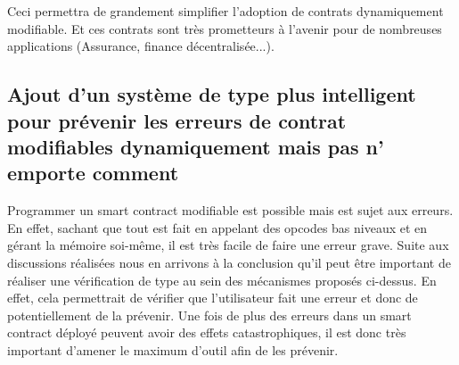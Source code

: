 Ceci permettra de grandement simplifier l'adoption de contrats dynamiquement modifiable. Et ces contrats sont très
prometteurs à l'avenir pour de nombreuses applications (Assurance, finance décentralisée...).

\subsection{Ajout d'un système de type plus intelligent pour prévenir les erreurs de contrat modifiables dynamiquement mais pas n' emporte comment}
%
Programmer un smart contract modifiable est possible mais est sujet aux erreurs. En effet, sachant que tout est fait
en appelant des opcodes bas niveaux et en gérant la mémoire soi-même, il est très facile de faire une erreur grave.
Suite aux discussions réalisées nous en arrivons à la conclusion qu'il peut être important de réaliser une vérification
de type au sein des mécanismes proposés ci-dessus. En effet, cela permettrait de vérifier que l'utilisateur fait une erreur
et donc de potentiellement de la prévenir. Une fois de plus des erreurs dans un smart contract déployé peuvent
avoir des effets catastrophiques, il est donc très important d'amener le maximum d'outil afin de les prévenir.
